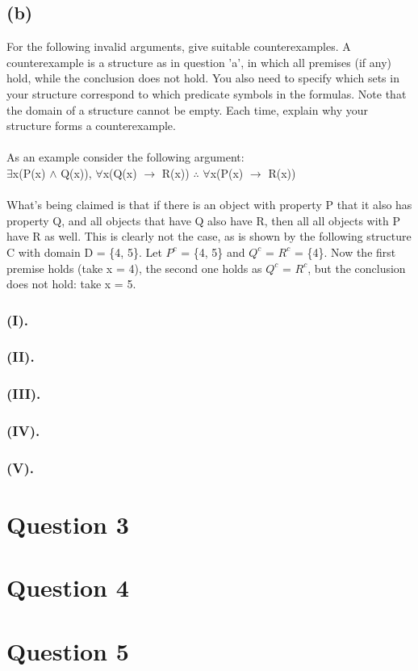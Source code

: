 \documentclass[a4paper]{article}
\begin{document}
\newpage
\subsection{(b)}
For the following invalid arguments, give suitable counterexamples. A counterexample is a structure
as in question 'a', in which all premises (if any) hold, while the conclusion does not hold. You also
need to specify which sets in your structure correspond to which predicate symbols in the formulas.
Note that the domain of a structure cannot be empty. Each time, explain why your structure forms
a counterexample.
\\\\
As an example consider the following argument:\\
$\exists $x(P(x) $\wedge $ Q(x)), $\forall $x(Q(x) $\rightarrow $ R(x)) $\therefore $ $\forall $x(P(x) $\rightarrow $ R(x))
\\\\
What's being claimed is that if there is an object with property P that it also has property Q, and
all objects that have Q also have R, then all all objects with P have R as well. This is clearly not
the case, as is shown by the following structure C with domain D = \{4, 5\}. Let $P^c$ = \{4, 5\} and
$Q^c$ = $R^c$ = \{4\}. Now the first premise holds (take x = 4), the second one holds as $Q^c$ = $R^c$, but
the conclusion does not hold: take x = 5.\\
\subsubsection{(I). }

\subsubsection{(II). }

\subsubsection{(III). }

\subsubsection{(IV). }

\subsubsection{(V). }

\newpage
\section{Question 3}

\newpage
\section{Question 4}

\newpage
\section{Question 5}
\end{document}
